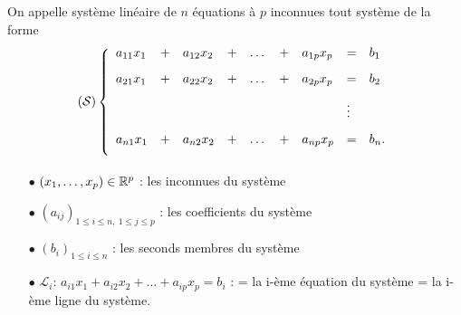 \documentclass[a4paper, 11pt]{article}
\begin{document}
{\noindent  

\begin{defi} 
On appelle syst\`eme lin\'eaire de $n$ \'equations \`a $p$ inconnues tout syst\`eme de la forme 
$$
(\mathcal{S})
\left\lbrace\begin{array}{lllllllll}
a_{11}x_1 & + & a_{12}x_2 & + & \dots & + & a_{1p}x_p & = & b_1\vsec\\
a_{21}x_1 & + & a_{22}x_2 & + & \dots & + & a_{2p}x_p & = & b_2\vsec\\
          &   &            &   &      &    &          & \vdots &   \vsec\\
a_{n1}x_1 & + & a_{n2}x_2 & + & \dots & + & a_{np}x_p & = & b_n.\vsec\\
\end{array}\right.$$
\begin{itemize}
\item[$\bullet$] $(x_1,\dots,x_p)\in\mathbb{R}^p$ : les inconnues du syst\`{e}me
\item[$\bullet$] $(a_{ij})_{1\leq i\leq n,\ 1\leq j\leq p}$ : les coefficients du syst\`eme
\item[$\bullet$] $(b_i)_{1\leq i\leq n}$ : les seconds membres du syst\`eme
\item[$\bullet$] $\mathcal{L}_i$: $a_{i1}x_1+a_{i2}x_2+\dots+a_{ip}x_p=b_i$ : = la i-\`eme \'equation du syst\`eme  = la i-\`eme ligne du syst\`eme.
\end{itemize}
\end{defi}

}
\end{document}
